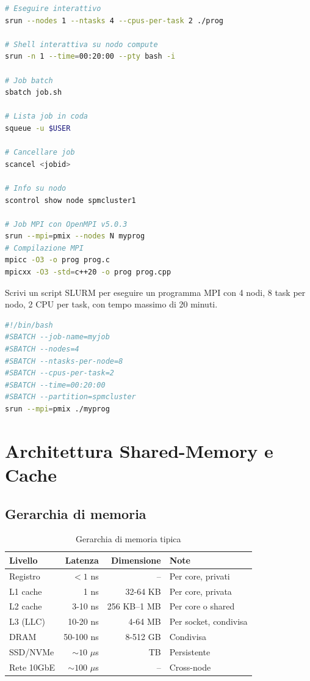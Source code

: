 \documentclass[11pt,a4paper]{article}
\theoremstyle{remark}
\newenvironment{esercizio}[1][]{%
  \begin{tcolorbox}[breakable,title={\textbf{Esercizio / Domanda d'esame}\ifx&#1&\else: #1\fi},
    colback=yellow!5!white, colframe=orange!75!black, fonttitle=\small\bfseries]%
}{%
  \end{tcolorbox}%
}
\newenvironment{risposta}{%
  \begin{tcolorbox}[breakable,title={\textbf{Risposta}},
    colback=green!5!white, colframe=green!50!black, fonttitle=\small\bfseries]%
}{%
  \end{tcolorbox}%
}
\begin{document}
\begin{lstlisting}[language=bash,style=cpp,numbers=none]
# Eseguire interattivo
srun --nodes 1 --ntasks 4 --cpus-per-task 2 ./prog

# Shell interattiva su nodo compute
srun -n 1 --time=00:20:00 --pty bash -i

# Job batch
sbatch job.sh

# Lista job in coda
squeue -u $USER

# Cancellare job
scancel <jobid>

# Info su nodo
scontrol show node spmcluster1

# Job MPI con OpenMPI v5.0.3
srun --mpi=pmix --nodes N myprog
# Compilazione MPI
mpicc -O3 -o prog prog.c
mpicxx -O3 -std=c++20 -o prog prog.cpp
\end{lstlisting}

\begin{esercizio}
Scrivi un script SLURM per eseguire un programma MPI con 4 nodi, 8 task per nodo, 2 CPU per task, con tempo massimo di 20 minuti.
\end{esercizio}
\begin{risposta}
\begin{lstlisting}[language=bash,style=cpp,numbers=none]
#!/bin/bash
#SBATCH --job-name=myjob
#SBATCH --nodes=4
#SBATCH --ntasks-per-node=8
#SBATCH --cpus-per-task=2
#SBATCH --time=00:20:00
#SBATCH --partition=spmcluster
srun --mpi=pmix ./myprog
\end{lstlisting}
\end{risposta}

\section{Architettura Shared-Memory e Cache}

\subsection{Gerarchia di memoria}

\begin{table}[H]
\centering
\begin{tabular}{lrrl}
\toprule
Livello & Latenza & Dimensione & Note \\
\midrule
Registro & $<1$ ns & -- & Per core, privati \\
L1 cache & 1 ns & 32-64 KB & Per core, privata \\
L2 cache & 3-10 ns & 256 KB--1 MB & Per core o shared \\
L3 (LLC) & 10-20 ns & 4-64 MB & Per socket, condivisa \\
DRAM & 50-100 ns & 8-512 GB & Condivisa \\
SSD/NVMe & $\sim10$ $\mu$s & TB & Persistente \\
Rete 10GbE & $\sim100$ $\mu$s & -- & Cross-node \\
\bottomrule
\end{tabular}
\caption{Gerarchia di memoria tipica}
\end{table}
\end{document}
